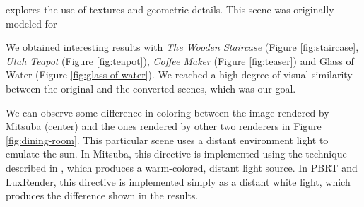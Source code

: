 explores the use of textures and geometric details. This scene was originally modeled for 

We obtained interesting results with \textit{The Wooden Staircase} (Figure 
\ref{fig:staircase}, \textit{Utah Teapot} (Figure \ref{fig:teapot}), 
\textit{Coffee Maker} (Figure \ref{fig:teaser}) and Glass of Water (Figure 
\ref{fig:glass-of-water}). We reached a high degree of visual similarity between 
the original and the converted scenes, which was our goal.

We can observe some difference in coloring between the image rendered by Mitsuba 
(center) and the ones rendered by other two renderers in Figure 
\ref{fig:dining-room}. This particular scene uses a distant environment light to 
emulate the sun. In Mitsuba, this directive is implemented using the technique 
described in \cite{Preetham}, which produces a warm-colored, distant light source. In 
PBRT and LuxRender, this directive is implemented simply as a distant white 
light, which produces the difference shown in the results.

